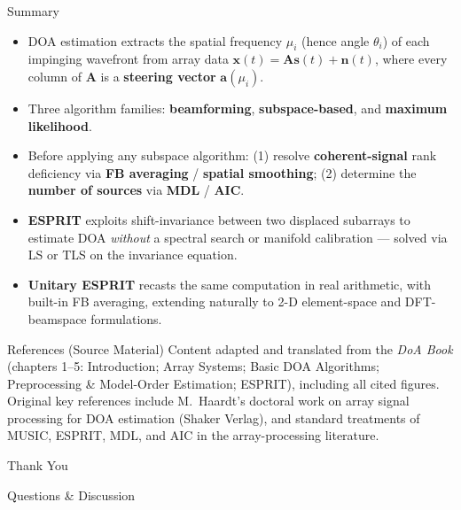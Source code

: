 \documentclass[10pt,aspectratio=169]{beamer}
\newcommand{\bx}{\bm{x}}
\newcommand{\bs}{\bm{s}}
\newcommand{\bn}{\bm{n}}
\newcommand{\bA}{\bm{A}}
\newcommand{\ba}{\bm{a}}
\begin{document}
\begin{frame}{Summary}
\begin{itemize}
	\item DOA estimation extracts the spatial frequency $\mu_i$ (hence angle $\theta_i$) of each impinging wavefront from array data $\bx(t)=\bA\bs(t)+\bn(t)$, where every column of $\bA$ is a \textbf{steering vector} $\ba(\mu_i)$.
	\item Three algorithm families: \textbf{beamforming}, \textbf{subspace-based}, and \textbf{maximum likelihood}.
	\item Before applying any subspace algorithm: (1) resolve \textbf{coherent-signal} rank deficiency via \textbf{FB averaging} / \textbf{spatial smoothing}; (2) determine the \textbf{number of sources} via \textbf{MDL} / \textbf{AIC}.
	\item \textbf{ESPRIT} exploits shift-invariance between two displaced subarrays to estimate DOA \emph{without} a spectral search or manifold calibration --- solved via LS or TLS on the invariance equation.
	\item \textbf{Unitary ESPRIT} recasts the same computation in real arithmetic, with built-in FB averaging, extending naturally to 2-D element-space and DFT-beamspace formulations.
\end{itemize}
\end{frame}

\begin{frame}{References (Source Material)}
\footnotesize
Content adapted and translated from the \emph{DoA Book} (chapters 1--5: Introduction; Array Systems; Basic DOA Algorithms; Preprocessing \& Model-Order Estimation; ESPRIT), including all cited figures. Original key references include M.~Haardt's doctoral work on array signal processing for DOA estimation (Shaker Verlag), and standard treatments of MUSIC, ESPRIT, MDL, and AIC in the array-processing literature.
\end{frame}

\begin{frame}
\centering
\Huge Thank You
\vspace{0.5cm}
\normalsize

\large Questions \& Discussion
\end{frame}
\end{document}
